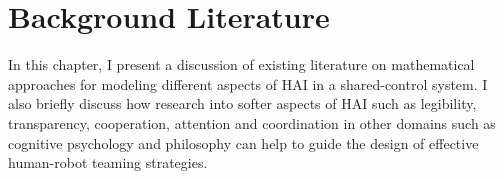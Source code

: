\documentclass[12pt]{article}
\newcommand{\DGc}[1]{{\textbf{\color{blue}{#1}}}}
\newcommand{\POINTS}[1]{{\textbf{\color{red}{#1}}}}
\begin{document}



\pagebreak

\section{Background Literature}
\label{sec:HRI_SA}

In this chapter, I present a discussion of existing literature on mathematical approaches for modeling different aspects of HAI in a shared-control system.  
I also briefly discuss how research into softer aspects of HAI such as legibility, transparency, cooperation, attention and coordination in other domains such as cognitive psychology and philosophy can help to guide the design of effective human-robot teaming strategies. 

\end{document}
